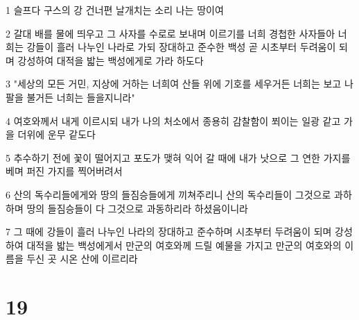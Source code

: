 \par 1 슬프다 구스의 강 건너편 날개치는 소리 나는 땅이여
\par 2 갈대 배를 물에 띄우고 그 사자를 수로로 보내며 이르기를 너희 경첩한 사자들아 너희는 강들이 흘러 나누인 나라로 가되 장대하고 준수한 백성 곧 시초부터 두려움이 되며 강성하여 대적을 밟는 백성에게로 가라 하도다
\par 3 "세상의 모든 거민, 지상에 거하는 너희여 산들 위에 기호를 세우거든 너희는 보고 나팔을 불거든 너희는 들을지니라"
\par 4 여호와께서 내게 이르시되 내가 나의 처소에서 종용히 감찰함이 쬐이는 일광 같고 가을 더위에 운무 같도다
\par 5 추수하기 전에 꽃이 떨어지고 포도가 맺혀 익어 갈 때에 내가 낫으로 그 연한 가지를 베며 퍼진 가지를 찍어버려서
\par 6 산의 독수리들에게와 땅의 들짐승들에게 끼쳐주리니 산의 독수리들이 그것으로 과하하며 땅의 들짐승들이 다 그것으로 과동하리라 하셨음이니라
\par 7 그 때에 강들이 흘러 나누인 나라의 장대하고 준수하며 시초부터 두려움이 되며 강성하여 대적을 밟는 백성에게서 만군의 여호와께 드릴 예물을 가지고 만군의 여호와의 이름을 두신 곳 시온 산에 이르리라

\chapter{19}

